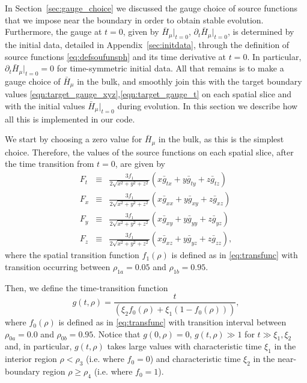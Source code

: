 \documentclass[a4paper,11pt]{article}
\numberwithin{equation}{section}
\begin{document}
In Section~\ref{sec:gauge_choice} we discussed the gauge choice of source functions that we impose near the boundary in order to obtain stable evolution. Furthermore, the gauge at $t=0$, given by $\bar{H}_{\mu}|_{t=0}$, $\partial_t \bar{H}_{\mu}|_{t=0}$, is determined by the initial data, detailed in Appendix~\ref{sec:initdata}, through the definition of source functions \eqref{eq:defsoufunsph} and its time derivative at $t=0$. In particular, $\partial_t \bar{H}_{\mu}|_{t=0}=0$ for time-symmetric initial data. All that remains is to make a gauge choice of $\bar{H}_\mu$ in the bulk, and smoothly join this with the target boundary values \eqref{eqn:target_gauge_xyz},\eqref{eqn:target_gauge_t} on each spatial slice and with the initial values $\bar{H}_{\mu}|_{t=0}$ during evolution. In this section we describe how all this is implemented in our code.

We start by choosing a zero value for $\bar{H}_\mu$ in the bulk, as this is the simplest choice. Therefore, the values of the source functions on each spatial slice, after the time transition from $t=0$, are given by
\begin{eqnarray}
\label{eqn:extend_gauge_txyz}
F_t&\equiv&\frac{3f_1}{2\sqrt{x^2+y^2+z^2}}(x \bar{g}_{tx}+y\bar{g}_{ty}+z\bar{g}_{tz}) \nonumber \\
F_x&\equiv&\frac{3f_1}{2\sqrt{x^2+y^2+z^2}}(x \bar{g}_{xx}+y\bar{g}_{xy}+z\bar{g}_{xz}) \nonumber \\
F_y&\equiv&\frac{3f_1}{2\sqrt{x^2+y^2+z^2}}(x \bar{g}_{xy}+y\bar{g}_{yy}+z\bar{g}_{yz}) \nonumber \\
F_z&\equiv&\frac{3f_1}{2\sqrt{x^2+y^2+z^2}}(x \bar{g}_{xz}+y\bar{g}_{yz}+z\bar{g}_{zz}),
\end{eqnarray}
where the spatial transition function $f_1(\rho)$ is defined as in \eqref{eq:transfunc} with transition occurring between $\rho_{1a}=0.05$ and $\rho_{1b}=0.95$.

Then, we define the time-transition function
\begin{equation}
g(t,\rho)=\frac{t}{(\xi_2 f_0(\rho)+\xi_1(1-f_0(\rho)))},
\end{equation}
where $f_0(\rho)$ is defined as in \eqref{eq:transfunc} with transition interval between $\rho_{0a}=0.0$ and $\rho_{0b}=0.95$. Notice that $g(0,\rho)=0$, $g(t,\rho)\gg 1$ for $t\gg\xi_1,\xi_2$ and, in particular, $g(t,\rho)$ takes large values with characteristic time $\xi_1$ in the interior region $\rho<\rho_3$ (i.e. where $f_0=0$) and characteristic time $\xi_2$ in the near-boundary region $\rho\geq\rho_4$ (i.e. where $f_0=1$).
\end{document}
